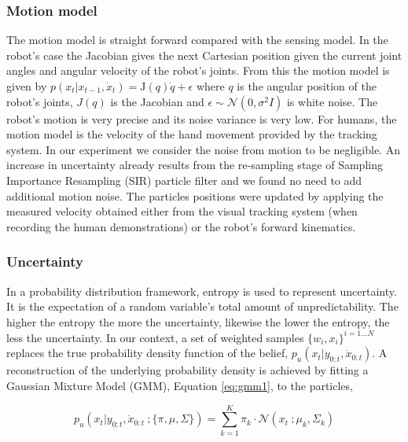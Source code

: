 \subsubsection{Motion model}

The motion model is straight forward compared with the sensing model. In the robot's case the Jacobian gives the next 
Cartesian position given the current joint angles and angular velocity of the robot's joints.
From this the motion model is given by $ p(x_{t}|x_{t-1},\dot{x}_{t}) = \mathrm{J}(q)\dot{q} + \epsilon$ where $q$ is 
the angular position of the robot's joints, $J(q)$ is the Jacobian and $\epsilon \sim \mathcal{N}(0,\sigma^{2}I)$ is white noise. 
The robot's motion is very precise and its noise variance is very low. For humans, the motion model is the velocity of the hand 
movement provided by the tracking system. In our experiment we consider the noise from motion to be negligible. An increase in 
uncertainty already results from the re-sampling stage of Sampling Importance Resampling (SIR) particle filter and we found 
no need to add additional motion noise.
The particles positions were updated by applying the measured velocity obtained either from the visual tracking system 
(when recording the human demonstrations) or the robot's forward kinematics.

\subsubsection{Uncertainty}


In a probability distribution framework, entropy is used to represent uncertainty. It is the expectation of a 
random variable's total amount of unpredictability. The higher the entropy the more the uncertainty, likewise the 
lower the entropy, the less the uncertainty. In our context, a set of weighted samples $\{w_{i},x_{i}\}^{i=1\dots N}$ replaces 
the true probability density function of the belief, $p_u(x_t|y_{0:t},\dot{x}_{0:t})$. A reconstruction of 
the underlying probability density is achieved by fitting a Gaussian  Mixture Model (GMM), Equation \ref{eq:gmm1}, to the particles,

\begin{equation}\label{eq:gmm1}
  p_u(x_t|y_{0:t},\dot{x}_{0:t}\: ;\{\pi,\mu,\Sigma\}) = \sum\limits_{k=1}^{K} \pi_{k} \cdot \mathcal{N}(x_t\: ;\mu_{k},\Sigma_{k} )
\end{equation}

